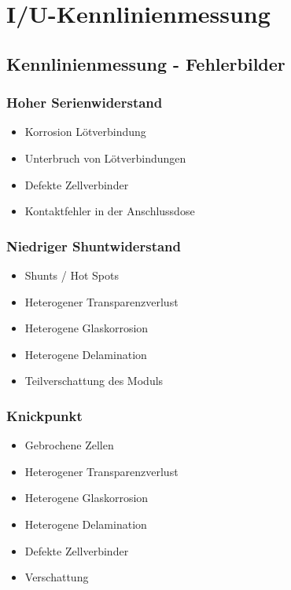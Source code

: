 \section{I/U-Kennlinienmessung}

\subsection{Kennlinienmessung - Fehlerbilder}

\subsubsection{Hoher Serienwiderstand}

\begin{itemize}
    \item Korrosion Lötverbindung
    \item Unterbruch von Lötverbindungen
    \item Defekte Zellverbinder
    \item Kontaktfehler in der Anschlussdose
\end{itemize}


\subsubsection{Niedriger Shuntwiderstand}

\begin{itemize}
    \item Shunts / Hot Spots
    \item Heterogener Transparenzverlust
    \item Heterogene Glaskorrosion
    \item Heterogene Delamination
    \item Teilverschattung des Moduls
\end{itemize}


\subsubsection{Knickpunkt}

\begin{itemize}
    \item Gebrochene Zellen
    \item Heterogener Transparenzverlust
    \item Heterogene Glaskorrosion
    \item Heterogene Delamination
    \item Defekte Zellverbinder
    \item Verschattung
\end{itemize}


